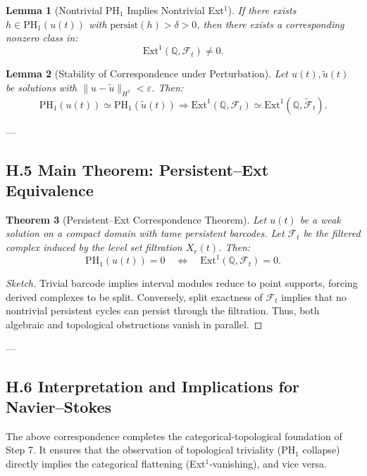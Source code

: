 \documentclass[11pt]{article}
\newtheorem{theorem}{Theorem}[section]
\newtheorem{lemma}[theorem]{Lemma}
\theoremstyle{definition}
\begin{document}
\begin{lemma}[Nontrivial PH$_1$ Implies Nontrivial Ext$^1$]
If there exists $h \in \mathrm{PH}_1(u(t))$ with $\text{persist}(h) > \delta > 0$, then there exists a corresponding nonzero class in:
\[
\mathrm{Ext}^1(\mathbb{Q}, \mathcal{F}_t) \neq 0.
\]
\end{lemma}

\begin{lemma}[Stability of Correspondence under Perturbation]
Let $u(t), \tilde{u}(t)$ be solutions with $\|u - \tilde{u}\|_{H^1} < \varepsilon$. Then:
\[
\mathrm{PH}_1(u(t)) \simeq \mathrm{PH}_1(\tilde{u}(t)) \Rightarrow \mathrm{Ext}^1(\mathbb{Q}, \mathcal{F}_t) \simeq \mathrm{Ext}^1(\mathbb{Q}, \tilde{\mathcal{F}}_t).
\]
\end{lemma}

---

\subsection*{H.5 Main Theorem: Persistent–Ext Equivalence}

\begin{theorem}[Persistent–Ext Correspondence Theorem]
Let $u(t)$ be a weak solution on a compact domain with tame persistent barcodes.  
Let $\mathcal{F}_t$ be the filtered complex induced by the level set filtration $X_r(t)$.  
Then:
\[
\mathrm{PH}_1(u(t)) = 0 \quad \Longleftrightarrow \quad \mathrm{Ext}^1(\mathbb{Q}, \mathcal{F}_t) = 0.
\]
\end{theorem}

\begin{proof}[Sketch]
Trivial barcode implies interval modules reduce to point supports, forcing derived complexes to be split.  
Conversely, split exactness of $\mathcal{F}_t$ implies that no nontrivial persistent cycles can persist through the filtration.  
Thus, both algebraic and topological obstructions vanish in parallel.
\end{proof}

---

\subsection*{H.6 Interpretation and Implications for Navier–Stokes}

The above correspondence completes the categorical-topological foundation of Step 7.  
It ensures that the observation of topological triviality (PH$_1$ collapse) directly implies the categorical flattening (Ext$^1$-vanishing), and vice versa.
\end{document}
